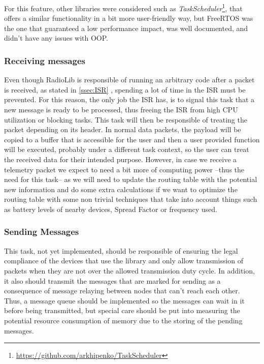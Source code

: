 For this feature, other libraries were considered such as \textit{TaskScheduler}\footnote{\url{https://github.com/arkhipenko/TaskScheduler}}, that offers a similar functionality in a bit more user-friendly way, but FreeRTOS was the one that guaranteed a low performance impact, was well documented, and didn't have any issues with OOP.

\subsubsection*{Receiving messages}
Even though RadioLib is responsible of running an arbitrary code after a packet is received, as stated in \ref{ssec:ISR}
, spending a lot of time in the ISR must be prevented. For this reason, the only job the ISR has, is to signal this task that a new message is ready to be processed, thus freeing the ISR from high CPU utilization or blocking tasks. This task will then be responsible of treating the packet depending on its header. In normal data packets, the payload will be copied to a buffer that is accessible for the user and then a user provided function will be executed, probably under a different task context, so the user can treat the received data for their intended purpose. However, in case we receive a telemetry packet we expect to need a bit more of computing power --thus the need for this task-- as we will need to update the routing table with the potential new information and do some extra calculations if we want to optimize the routing table with some non trivial techniques that take into account things such as battery levels of nearby devices, Spread Factor or frequency used.

\subsubsection*{Sending Messages}
This task, not yet implemented, should be responsible of ensuring the legal compliance of the devices that use the library and only allow transmission of packets when they are not over the allowed transmission duty cycle. In addition, it also should transmit the messages that are marked for sending as a consequence of message relaying between nodes that can't reach each other. Thus, a message queue should be implemented so the messages can wait in it before being transmitted, but special care should be put into measuring the potential resource consumption of memory due to the storing of the pending messages.
